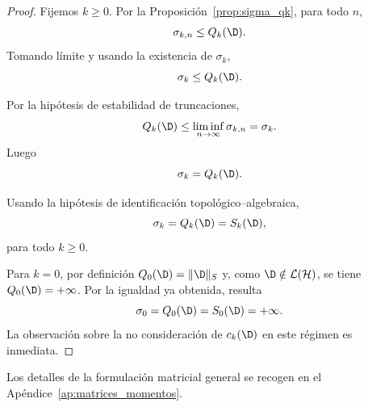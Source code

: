 \begin{proof}
	Fijemos $k\ge 0$. Por la Proposición~\ref{prop:sigma_qk}, para todo $n$,
	\[
		\sigma_{k,n}\le Q_k(\D).
	\]
	Tomando límite y usando la existencia de $\sigma_k$,
	\[
		\sigma_k\le Q_k(\D).
	\]

	Por la hipótesis de estabilidad de truncaciones,
	\[
		Q_k(\D)\le \liminf_{n\to\infty}\sigma_{k,n}=\sigma_k.
	\]
	Luego
	\[
		\sigma_k=Q_k(\D).
	\]

	Usando la hipótesis de identificación topológico--algebraica,
	\[
		\sigma_k=Q_k(\D)=S_k(\D),
	\]
	para todo $k\ge0$.

	Para $k=0$, por definición $Q_0(\D)=\|\D\|_S$ y, como
	$\D\notin\mathcal L(\mathcal H)$, se tiene $Q_0(\D)=+\infty$.
	Por la igualdad ya obtenida, resulta
	\[
		\sigma_0=Q_0(\D)=S_0(\D)=+\infty.
	\]
	La observación sobre la no consideración de $c_k(\D)$ en este régimen es inmediata.
\end{proof}

Los detalles de la formulación matricial general se recogen en el Apéndice~\ref{ap:matrices_momentos}.

